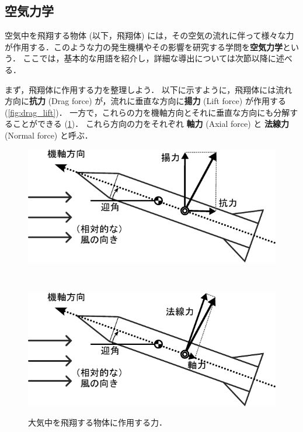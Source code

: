 \documentclass[uplatex,dvipdfmx,a4j,11pt]{jsreport}
\newcommand{\keyword}[1]{\textcolor{mainblue}{\textbf{#1}}}
\numberwithin{equation}{chapter}
\begin{document}
\subsection{空気力学}
空気中を飛翔する物体 (以下，飛翔体) には，その空気の流れに伴って様々な力が作用する．このような力の発生機構やその影響を研究する学問を\keyword{空気力学}という．
ここでは，基本的な用語を紹介し，詳細な導出については次節以降に述べる．

\enskip

まず，飛翔体に作用する力を整理しよう．
以下に示すように，飛翔体には流れ方向に\keyword{抗力} (Drag force) が，流れに垂直な方向に\keyword{揚力} (Lift force) が作用する (\cref{fig:drag_lift})．
一方で，これらの力を機軸方向とそれに垂直な方向にも分解することができる (\cref{fig:axial_normal})．
これら方向の力をそれぞれ \keyword{軸力} (Axial force) と \keyword{法線力} (Normal force) と呼ぶ．

\begin{figure}[H]
  \centering
  \begin{minipage}{\hsize}
    \centering
    \includegraphics{aero/img/drag_lift.pdf}
    \label{fig:drag_lift}
  \end{minipage}\\
  \begin{minipage}{\hsize}
    \centering
    \includegraphics{aero/img/axial_normal.pdf}
    \label{fig:axial_normal}
  \end{minipage}
  \caption{大気中を飛翔する物体に作用する力．}
\end{figure}
\end{document}
